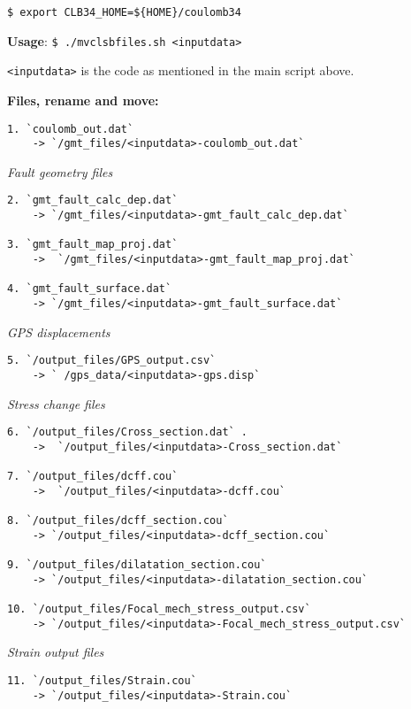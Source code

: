 \texttt{\$\ export\ CLB34\_HOME=\$\{HOME\}/coulomb34}

\textbf{Usage}:
\texttt{\$\ ./mvclsbfiles.sh\ \textless{}inputdata\textgreater{}}

\texttt{\textless{}inputdata\textgreater{}} is the code as mentioned in
the main script above.

\textbf{Files, rename and move:}

\begin{verbatim}
1. `coulomb_out.dat`  
    -> `/gmt_files/<inputdata>-coulomb_out.dat`
\end{verbatim}

\emph{Fault geometry files}

\begin{verbatim}
2. `gmt_fault_calc_dep.dat` 
    -> `/gmt_files/<inputdata>-gmt_fault_calc_dep.dat`

3. `gmt_fault_map_proj.dat` 
    ->  `/gmt_files/<inputdata>-gmt_fault_map_proj.dat`

4. `gmt_fault_surface.dat`  
    -> `/gmt_files/<inputdata>-gmt_fault_surface.dat`
\end{verbatim}

\emph{GPS displacements}

\begin{verbatim}
5. `/output_files/GPS_output.csv` 
    -> ` /gps_data/<inputdata>-gps.disp`
\end{verbatim}

\emph{Stress change files}

\begin{verbatim}
6. `/output_files/Cross_section.dat` .
    ->  `/output_files/<inputdata>-Cross_section.dat`

7. `/output_files/dcff.cou` 
    ->  `/output_files/<inputdata>-dcff.cou`

8. `/output_files/dcff_section.cou` 
    -> `/output_files/<inputdata>-dcff_section.cou`

9. `/output_files/dilatation_section.cou` 
    -> `/output_files/<inputdata>-dilatation_section.cou`

10. `/output_files/Focal_mech_stress_output.csv` 
    -> `/output_files/<inputdata>-Focal_mech_stress_output.csv`
\end{verbatim}

\emph{Strain output files}

\begin{verbatim}
11. `/output_files/Strain.cou` 
    -> `/output_files/<inputdata>-Strain.cou`
\end{verbatim}

